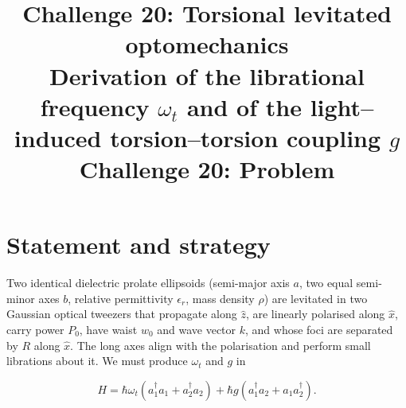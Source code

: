 \documentclass[11pt,a4paper]{article}
\title{\bfseries Challenge 20: Torsional levitated optomechanics\\[2pt]
\large Derivation of the librational frequency $\omega_t$ and of the
light--induced torsion--torsion coupling $g$}
\author{}
\date{}
\title{Challenge 20: Problem}
\author{}
\begin{document}
\maketitle
\section{Statement and strategy}

Two identical dielectric prolate ellipsoids (semi-major axis $a$, two equal
semi-minor axes $b$, relative permittivity $\epsilon_r$, mass density $\rho$) are
levitated in two Gaussian optical tweezers that propagate along $\hat z$, are
linearly polarised along $\hat x$, carry power $P_0$, have waist $w_0$ and wave
vector $k$, and whose foci are separated by $R$ along $\hat x$.  The long axes
align with the polarisation and perform small librations about it.  We must
produce $\omega_t$ and $g$ in

\begin{equation}
  H=\hbar\omega_t\left(a_1^{\dagger}a_1+a_2^{\dagger}a_2\right)
   +\hbar g\left(a_1^{\dagger}a_2+a_1a_2^{\dagger}\right).
  \label{eq:H}
\end{equation}
\end{document}
